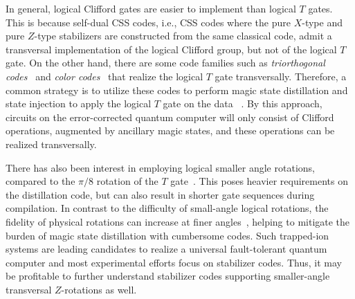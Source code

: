 \documentclass[twoside,romanappendices]{IEEEtran}
\newcommand{\red}[1]{{\color{red}#1}}
\begin{document}
In general, logical Clifford gates are easier to implement than logical $T$ gates.
This is because self-dual CSS codes, i.e., CSS codes where the pure $X$-type and pure $Z$-type stabilizers are constructed from the same classical code, admit a transversal implementation of the logical Clifford group, but not of the logical $T$ gate.
On the other hand, there are some code families such as \emph{triorthogonal codes}~\cite{Bravyi-pra12} and \emph{color codes}~\cite{Kubica-pra15} that realize the logical $T$ gate transversally.
Therefore, a common strategy is to utilize these codes to perform magic state distillation and state injection to apply the logical $T$ gate on the data ~\cite{Bravyi-pra12,Gottesman-nature99,Bravyi-pra05}.
By this approach, circuits on the error-corrected quantum computer will only consist of Clifford operations, augmented by ancillary magic states, and these operations can be realized transversally.

There has also been interest in employing logical smaller angle rotations, compared to the $\pi/8$ rotation of the $T$ gate~\cite{Landahl-arxiv13}.  
This poses heavier requirements on the distillation code, but can also result in shorter gate sequences during compilation.  
In contrast to the difficulty of small-angle logical rotations, the fidelity of physical rotations can increase at finer angles~\cite{Nam-arxiv19}, helping to mitigate the burden of magic state distillation with cumbersome codes.  
Such trapped-ion systems are leading candidates to realize a universal fault-tolerant quantum computer and most experimental efforts focus on stabilizer codes.
Thus, it may be profitable to further understand stabilizer codes supporting smaller-angle transversal $Z$-rotations as well.
\end{document}
